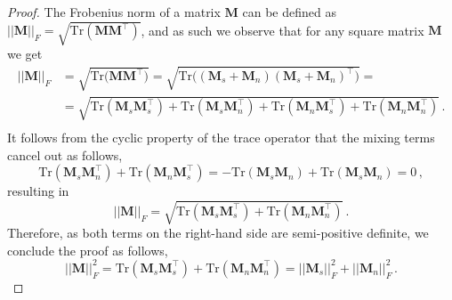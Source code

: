 \begin{proof}
%
    The Frobenius norm of a matrix $\bm{M}$ can be defined as $|| \bm{M} ||_F = \sqrt{\text{Tr}(\bm{M} \bm{M}^\top)}$, and as such we observe that for any square matrix $\bm{M}$ we get
    \begin{equation}
    \begin{split}
        ||\bm{M}||_F & = \sqrt{\text{Tr}\big(\bm{M} \bm{M}^\top \big)} = \sqrt{\text{Tr}\big((\bm{M}_s + \bm{M}_n)(\bm{M}_s + \bm{M}_n)^\top\big)} = \\
        & = \sqrt{\text{Tr}(\bm{M}_s \bm{M}_s^\top) + \text{Tr}(\bm{M}_s \bm{M}_n^\top) + \text{Tr}(\bm{M}_n \bm{M}_s^\top) + \text{Tr}(\bm{M}_n \bm{M}_n^\top)}\,. \\
    \end{split}
    \end{equation}
    It follows from the cyclic property of the trace operator that the mixing terms cancel out as follows,
    \begin{equation}
        \text{Tr}(\bm{M}_s \bm{M}_n^\top) + \text{Tr}(\bm{M}_n \bm{M}_s^\top) = - \text{Tr}(\bm{M}_s \bm{M}_n) + \text{Tr}(\bm{M}_s \bm{M}_n) = 0 \,,
    \end{equation}
    resulting in
    \begin{equation}
        ||\bm{M}||_F  = \sqrt{\text{Tr}(\bm{M}_s \bm{M}_s^\top) + \text{Tr}(\bm{M}_n \bm{M}_n^\top)}\,.
    \end{equation}
    Therefore, as both terms on the right-hand side are semi-positive definite, we conclude the proof as follows,
    \begin{equation}
        ||\bm{M}||_F^2 = \text{Tr}(\bm{M}_s \bm{M}_s^\top) + \text{Tr}(\bm{M}_n \bm{M}_n^\top) = ||\bm{M}_s||_F^2 + ||\bm{M}_n||_F^2 \,.
    \end{equation}
%
\end{proof}
%